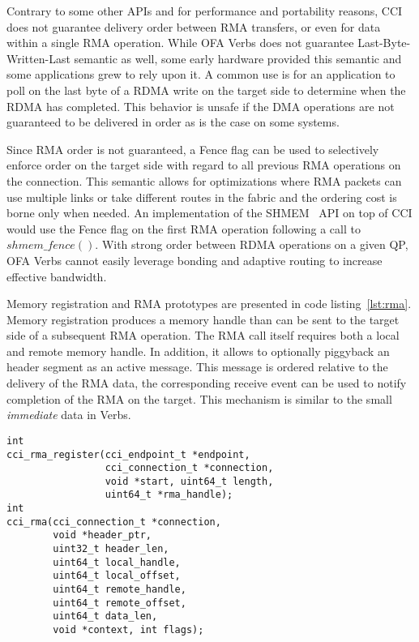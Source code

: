 Contrary to some other APIs  and for performance and portability reasons, CCI does not guarantee delivery order between RMA transfers, or even for data within a single RMA operation. While OFA Verbs does not guarantee Last-Byte-Written-Last semantic as well, some early hardware provided this semantic and some applications grew to rely upon it. A common use is for an application to poll on the last byte of a RDMA write on the target side to determine when the RDMA has completed. This behavior is unsafe if the DMA operations are not guaranteed to be delivered in order as is the case on some systems.

Since RMA order is not guaranteed, a Fence flag can be used to selectively 
enforce order on the target side with regard to all previous RMA operations 
on the connection. This semantic allows for optimizations where RMA packets 
can use multiple links or take different routes in the fabric and the ordering 
cost is borne only when needed. An implementation of the SHMEM~\cite{openshmem} API on top of CCI would use the Fence flag on the first RMA operation following a call to $shmem\_fence()$. With strong order between RDMA operations on a given QP, OFA Verbs cannot easily leverage bonding and adaptive routing to increase effective bandwidth.

Memory registration and RMA prototypes are presented in code listing~\ref{lst:rma}. Memory registration produces a memory handle than can be sent to the target side of a subsequent RMA operation. The RMA call itself requires both a local and remote memory handle. In addition, it allows to optionally piggyback an header segment as an active message. This message is ordered relative to the delivery of the RMA data, the corresponding receive event can be used to notify completion of the RMA on the target. This mechanism is similar to the small \emph{immediate} data in Verbs.

\begin{lstlisting}[label=lst:rma, caption=CCI RMA prototypes]
int 
cci_rma_register(cci_endpoint_t *endpoint,
                 cci_connection_t *connection,
                 void *start, uint64_t length,
                 uint64_t *rma_handle);
int 
cci_rma(cci_connection_t *connection, 
        void *header_ptr, 
        uint32_t header_len, 
        uint64_t local_handle, 
        uint64_t local_offset, 
        uint64_t remote_handle, 
        uint64_t remote_offset,
        uint64_t data_len, 
        void *context, int flags);
\end{lstlisting}

